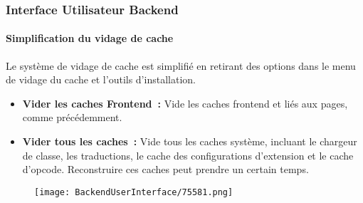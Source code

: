 \begin{frame}[fragile]
	\frametitle{Interface Utilisateur Backend}
	\framesubtitle{Simplification du vidage de cache}

	Le système de vidage de cache est simplifié en retirant des options dans le menu de vidage
	du cache et l'outils d'installation.

	\begin{itemize}

		\item \textbf{Vider les caches Frontend~:}\newline
			\small
				Vide les caches frontend et liés aux pages, comme précédemment.
			\normalsize

		\item \textbf{Vider tous les caches~:}\newline
			\small
				Vide tous les caches système, incluant le chargeur de classe, les traductions,
				le cache des configurations d'extension et le cache d'opcode. Reconstruire ces
				caches peut prendre un certain temps.
			\normalsize

	\end{itemize}

	\begin{figure}
		\texttt{[image: BackendUserInterface/75581.png]}
	\end{figure}

\end{frame}

